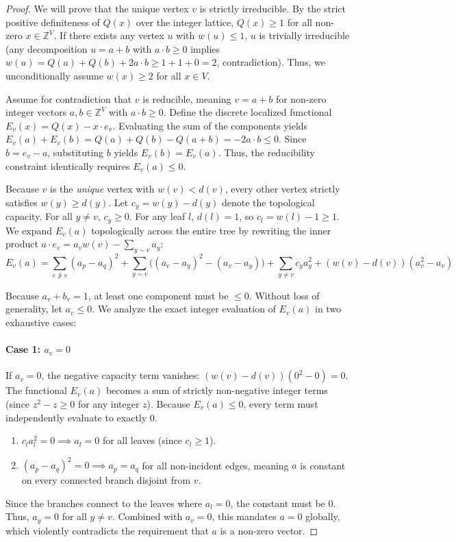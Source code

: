 \documentclass[12pt]{article}
\begin{document}
\begin{proof}
We will prove that the unique vertex $v$ is strictly irreducible.
By the strict positive definiteness of $Q(x)$ over the integer lattice, $Q(x) \ge 1$ for all non-zero $x \in \mathbb{Z}^V$. If there exists any vertex $u$ with $w(u) \le 1$, $u$ is trivially irreducible (any decomposition $u = a+b$ with $a \cdot b \ge 0$ implies $w(u) = Q(a) + Q(b) + 2a \cdot b \ge 1 + 1 + 0 = 2$, contradiction). Thus, we unconditionally assume $w(x) \ge 2$ for all $x \in V$.

Assume for contradiction that $v$ is reducible, meaning $v = a + b$ for non-zero integer vectors $a, b \in \mathbb{Z}^V$ with $a \cdot b \ge 0$.
Define the discrete localized functional $E_v(x) = Q(x) - x \cdot e_v$. 
Evaluating the sum of the components yields $E_v(a) + E_v(b) = Q(a) + Q(b) - Q(a+b) = -2a \cdot b \le 0$. 
Since $b = e_v - a$, substituting $b$ yields $E_v(b) = E_v(a)$. Thus, the reducibility constraint identically requires $E_v(a) \le 0$.

Because $v$ is the \emph{unique} vertex with $w(v) < d(v)$, every other vertex strictly satisfies $w(y) \ge d(y)$. Let $c_y = w(y) - d(y)$ denote the topological capacity. For all $y \ne v$, $c_y \ge 0$. For any leaf $l$, $d(l) = 1$, so $c_l = w(l) - 1 \ge 1$.
We expand $E_v(a)$ topologically across the entire tree by rewriting the inner product $a \cdot e_v = a_v w(v) - \sum_{y \sim v} a_y$:
\[
E_v(a) = \sum_{e \not\ni v} (a_p - a_q)^2 + \sum_{y \sim v} \big( (a_v - a_y)^2 - (a_v - a_y) \big) + \sum_{y \ne v} c_y a_y^2 + (w(v) - d(v))(a_v^2 - a_v)
\]

Because $a_v + b_v = 1$, at least one component must be $\le 0$. Without loss of generality, let $a_v \le 0$.
We analyze the exact integer evaluation of $E_v(a)$ in two exhaustive cases:

\paragraph{Case 1: $a_v = 0$} 
If $a_v = 0$, the negative capacity term vanishes: $(w(v) - d(v))(0^2 - 0) = 0$. 
The functional $E_v(a)$ becomes a sum of strictly non-negative integer terms (since $z^2 - z \ge 0$ for any integer $z$). 
Because $E_v(a) \le 0$, every term must independently evaluate to exactly $0$.
\begin{enumerate}
    \item $c_l a_l^2 = 0 \implies a_l = 0$ for all leaves (since $c_l \ge 1$).
    \item $(a_p - a_q)^2 = 0 \implies a_p = a_q$ for all non-incident edges, meaning $a$ is constant on every connected branch disjoint from $v$.
\end{enumerate}
Since the branches connect to the leaves where $a_l = 0$, the constant must be $0$. Thus, $a_y = 0$ for all $y \ne v$. 
Combined with $a_v = 0$, this mandates $a = 0$ globally, which violently contradicts the requirement that $a$ is a non-zero vector.


\end{proof}
\end{document}
